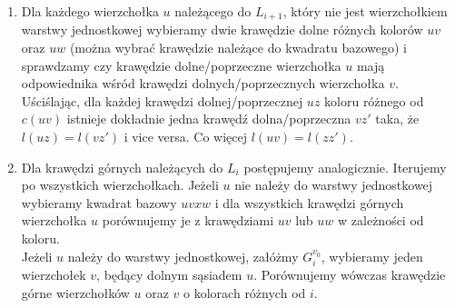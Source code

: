 \documentclass[12pt,a4paper,titlepage]{article}
\begin{document}
\begin{enumerate}
\item
Dla każdego wierzchołka $u$ należącego do $L_{i+1}$, który nie jest wierzchołkiem warstwy jednostkowej wybieramy dwie krawędzie dolne różnych kolorów $uv$ oraz $uw$ (można wybrać krawędzie należące do kwadratu bazowego) i sprawdzamy czy krawędzie dolne/poprzeczne wierzchołka $u$ mają odpowiednika wśród krawędzi dolnych/poprzecznych wierzchołka $v$. Uściślając, dla każdej krawędzi dolnej/poprzecznej $uz$ koloru różnego od $c(uv)$ istnieje dokładnie jedna krawędź dolna/poprzeczna $vz'$ taka, że $l(uz)=l(vz')$ i vice versa. Co więcej $l(uv)=l(zz')$.
\item
Dla krawędzi górnych należących do $L_i$ postępujemy analogicznie. Iterujemy po wszystkich wierzchołkach. Jeżeli $u$ nie należy do warstwy jednostkowej wybieramy kwadrat bazowy $uvxw$ i dla wszystkich krawędzi górnych wierzchołka $u$ porównujemy je z krawędziami $uv$ lub $uw$ w zależności od koloru.\\
Jeżeli $u$ należy do warstwy jednostkowej, załóżmy $G^{v_0}_i$, wybieramy jeden wierzchołek $v$, będący dolnym sąsiadem $u$. Porównujemy wówczas krawędzie górne wierzchołków $u$ oraz $v$ o kolorach różnych od $i$. 
\end{enumerate}
\end{document}
